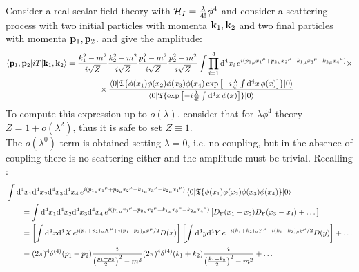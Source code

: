 Consider a real scalar field theory with $ \mathcal{H}_I = \frac{\lambda}{4!} \phi^4 $ and consider a scattering process with two initial particles with momenta $ \mathbf{k}_1 , \mathbf{k}_2 $ and two final particles with momenta $ \mathbf{p}_1 , \mathbf{p}_2 $.  and  give the amplitude:
\begin{equation*}
  \begin{split}
    \braket{\mathbf{p}_1 , \mathbf{p}_2 | i T | \mathbf{k}_1 , \mathbf{k}_2}
    & = \frac{k_1^2 - m^2}{i \sqrt{Z}} \frac{k_2^2 - m^2}{i \sqrt{Z}} \frac{p_1^2 - m^2}{i \sqrt{Z}} \frac{p_2^2 - m^2}{i \sqrt{Z}} \int \prod_{i = 1}^4 \mathrm{d}^4x_i\, e^{i ({p_1}_\mu {x_1}^\mu + {p_2}_\mu {x_2}^\mu - {k_1}_\mu {x_3}^\mu - {k_2}_\mu {x_4}^\mu)} \times \\
    & \qquad \qquad \times \frac{\braket{0 | \mathfrak{T}\{ \phi(x_1) \phi(x_2) \phi(x_3) \phi(x_4) \exp \left[ -i \frac{\lambda}{4!} \int \mathrm{d}^4x\, \phi(x) \right] \} | 0}}{\braket{0 | \mathfrak{T}\{\exp \left[ - i \frac{\lambda}{4!} \int \mathrm{d}^4x\, \phi(x) \right]\} | 0}}
  \end{split}
\end{equation*}
To compute this expression up to $ o(\lambda) $, consider that for $ \lambda \phi^4 $-theory $ Z = 1 + o(\lambda^2) $, thus it is safe to set $ Z \equiv 1 $. \\
The $ o(\lambda^0) $ term is obtained setting $ \lambda = 0 $, i.e. no coupling, but in the absence of coupling there is no scattering either and the amplitude must be trivial. Recalling :
\begin{equation*}
  \begin{split}
    & \int \mathrm{d}^4x_1 \mathrm{d}^4x_2 \mathrm{d}^4x_3 \mathrm{d}^4x_4\, e^{i ({p_1}_\mu {x_1}^\mu + {p_2}_\mu {x_2}^\mu - {k_1}_\mu {x_3}^\mu - {k_2}_\mu {x_4}^\mu)} \braket{0 | \mathfrak{T}\{\phi(x_1) \phi(x_2) \phi(x_3) \phi(x_4)\} | 0} \\
    & \qquad = \int \mathrm{d}^4x_1 \mathrm{d}^4x_2 \mathrm{d}^4x_3 \mathrm{d}^4x_4\, e^{i ({p_1}_\mu {x_1}^\mu + {p_2}_\mu {x_2}^\mu - {k_1}_\mu {x_3}^\mu - {k_2}_\mu {x_4}^\mu)} \left[ D_\text{F}(x_1 - x_2) D_\text{F}(x_3 - x_4) + \dots \right] \\
    & \qquad = \left[ \int \mathrm{d}^4x \mathrm{d}^4X\, e^{i (p_1 + p_2)_\mu X^\mu + i (p_1 - p_2)_\mu x^\mu/2} D(x) \right] \left[ \int \mathrm{d}^4y \mathrm{d}^4Y\, e^{- i (k_1 + k_2)_\mu Y^\mu - i (k_1 - k_2)_\mu y^\mu/2} D(y) \right] + \dots \\
    & \qquad = (2\pi)^4 \delta^{(4)}(p_1 + p_2) \frac{i}{\left( \frac{p_1 - p_2}{2} \right)^2 - m^2} (2\pi)^4 \delta^{(4)}(k_1 + k_2) \frac{i}{\left( \frac{k_1 - k_2}{2} \right)^2 - m^2} + \dots
  \end{split}
\end{equation*}
